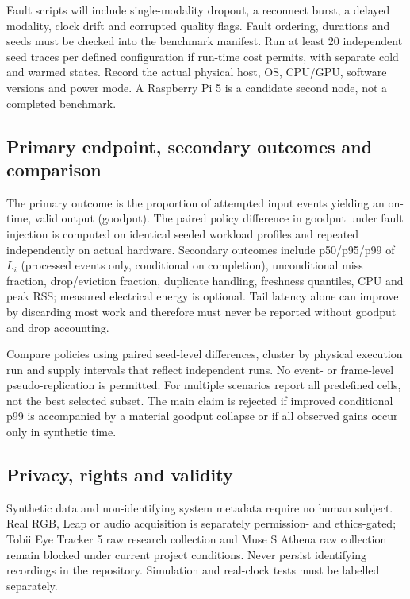 Fault scripts will include single-modality dropout, a reconnect burst, a delayed modality, clock drift and corrupted quality flags. Fault ordering, durations and seeds must be checked into the benchmark manifest. Run at least 20 independent seed traces per defined configuration if run-time cost permits, with separate cold and warmed states. Record the actual physical host, OS, CPU/GPU, software versions and power mode. A Raspberry Pi 5 is a candidate second node, not a completed benchmark.

\subsection{Primary endpoint, secondary outcomes and comparison}
The primary outcome is the proportion of attempted input events yielding an on-time, valid output (goodput). The paired policy difference in goodput under fault injection is computed on identical seeded workload profiles and repeated independently on actual hardware. Secondary outcomes include p50/p95/p99 of $L_i$ (processed events only, conditional on completion), unconditional miss fraction, drop/eviction fraction, duplicate handling, freshness quantiles, CPU and peak RSS; measured electrical energy is optional. Tail latency alone can improve by discarding most work and therefore must never be reported without goodput and drop accounting.

Compare policies using paired seed-level differences, cluster by physical execution run and supply intervals that reflect independent runs. No event- or frame-level pseudo-replication is permitted. For multiple scenarios report all predefined cells, not the best selected subset. The main claim is rejected if improved conditional p99 is accompanied by a material goodput collapse or if all observed gains occur only in synthetic time.

\subsection{Privacy, rights and validity}
Synthetic data and non-identifying system metadata require no human subject. Real RGB, Leap or audio acquisition is separately permission- and ethics-gated; Tobii Eye Tracker 5 raw research collection and Muse S Athena raw collection remain blocked under current project conditions. Never persist identifying recordings in the repository. Simulation and real-clock tests must be labelled separately.
